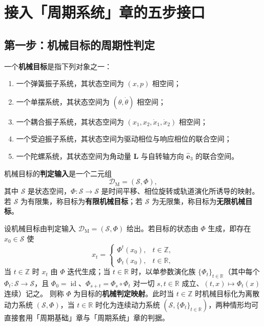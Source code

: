 \section{接入「周期系统」章的五步接口}
\label{sec:mech_five_steps}

\subsection{第一步：机械目标的周期性判定}

\begin{definition}[机械目标与判定输入]\label{def:mech_target}
一个\textbf{机械目标}是指下列对象之一：
\begin{enumerate}[label=(\roman*)]
    \item 一个弹簧振子系统，其状态空间为 $(x,p)$ 相空间；
    \item 一个单摆系统，其状态空间为 $(\theta,\dot\theta)$ 相空间；
    \item 一个耦合振子系统，其状态空间为 $(x_1,x_2,\dot x_1,\dot x_2)$ 相空间；
    \item 一个受迫振子系统，其状态空间为驱动相位与响应相位的联合空间；
    \item 一个陀螺系统，其状态空间为角动量 $\mathbf L$ 与自转轴方向 $\hat{\mathbf e}_3$ 的联合空间。
\end{enumerate}
机械目标的\textbf{判定输入}是一个二元组
\[
\mathcal D_{\mathrm{M}}=(\mathcal S,\Phi),
\]
其中 $\mathcal S$ 是状态空间，$\Phi:\mathcal S\to\mathcal S$ 是时间平移、相位旋转或轨道演化所诱导的映射。若 $\mathcal S$ 为有限集，称目标为\textbf{有限机械目标}；若 $\mathcal S$ 为无限集，称目标为\textbf{无限机械目标}。
\end{definition}

\begin{definition}[机械判定映射]\label{def:mech_periodization}
设机械目标由判定输入 $\mathcal D_{\mathrm{M}}=(\mathcal S,\Phi)$ 给出。若目标的状态由 $\Phi$ 生成，即存在 $x_0\in\mathcal S$ 使
\[
x_t=\begin{cases}\Phi^t(x_0), & t\in\mathbb Z,\\ \Phi_t(x_0), & t\in\mathbb R,\end{cases}
\]
当 $t\in\mathbb Z$ 时 $x_t$ 由 $\Phi$ 迭代生成；当 $t\in\mathbb R$ 时，以单参数演化族 $\{\Phi_t\}_{t\in\mathbb R}$（其中每个 $\Phi_t:\mathcal S\to\mathcal S$，且 $\Phi_0=\operatorname{id}$、$\Phi_{s+t}=\Phi_s\circ\Phi_t$ 对一切 $s,t\in\mathbb R$ 成立、$(t,x)\mapsto\Phi_t(x)$ 连续）记之。
则称 $\Phi$ 为目标的\textbf{机械判定映射}。此时当 $t\in\mathbb Z$ 时机械目标化为离散动力系统 $(\mathcal S,\Phi)$，当 $t\in\mathbb R$ 时化为连续动力系统 $(\mathcal S,\{\Phi_t\}_{t\in\mathbb R})$，两种情形均可直接套用「周期基础」章与「周期系统」章的判据。
\end{definition}

